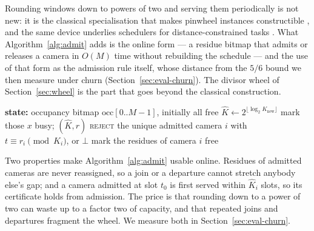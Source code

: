 \documentclass[final,5p,times,twocolumn]{elsarticle}
\theoremstyle{definition}
\begin{document}
Rounding windows down to powers of two and serving them periodically is not new: it is the
classical specialisation that makes pinwheel instances constructible
\cite{holte1989pinwheel}, and the same device underlies schedulers for distance-constrained
tasks \cite{han1996distance}. What Algorithm~\ref{alg:admit} adds is the online form --- a
residue bitmap that admits or releases a camera in $O(M)$ time without rebuilding the
schedule --- and the use of that form as the admission rule itself, whose distance from the
$5/6$ bound we then measure under churn (Section~\ref{sec:eval-churn}). The divisor wheel of
Section~\ref{sec:wheel} is the part that goes beyond the classical construction.

\begin{algorithm}[t]
\caption{Admission and service on one edge box}
\label{alg:admit}
\begin{algorithmic}[1]
\State \textbf{state:} occupancy bitmap $\mathrm{occ}[0..M-1]$, initially all free
  \State $\hat K \gets 2^{\lfloor\log_2 K_{\mathrm{new}}\rfloor}$
        \State mark those $x$ busy; \Return $(\hat K, r)$ 
     \EndIf
  \EndFor
  \State \Return \textsc{reject} 
\EndProcedure
{}
  \State \Return the unique admitted camera $i$ with $t \equiv r_i \pmod{\hat K_i}$, or $\bot$
\EndProcedure
{} \State mark the residues of camera $i$ free \EndProcedure
\end{algorithmic}
\end{algorithm}

Two properties make Algorithm~\ref{alg:admit} usable online. Residues of admitted cameras are
never reassigned, so a join or a departure cannot stretch anybody else's gap; and a camera
admitted at slot $t_0$ is first served within $\hat K_i$ slots, so its certificate holds from
admission. The price is that rounding down to a power of two can waste up to a factor two of
capacity, and that repeated joins and departures fragment the wheel. We measure both in
Section~\ref{sec:eval-churn}.
\end{document}
